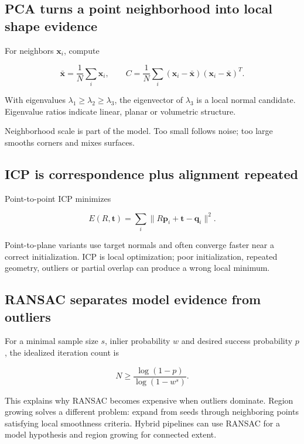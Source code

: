 \subsection{PCA turns a point neighborhood into local shape evidence}\label{04-visual-computing-ii-ch035-pca-turns-a-point-neighborhood-into-local-shape-evidence}

For neighbors \(\mathbf x_i\), compute

\[
\bar{\mathbf x}=\frac1N\sum_i\mathbf x_i,
\qquad
C=\frac1N\sum_i(\mathbf x_i-\bar{\mathbf x})(\mathbf x_i-\bar{\mathbf x})^T.
\]

With eigenvalues \(\lambda_1\ge\lambda_2\ge\lambda_3\), the eigenvector of \(\lambda_3\) is a local normal candidate. Eigenvalue ratios indicate linear, planar or volumetric structure.

Neighborhood scale is part of the model. Too small follows noise; too large smooths corners and mixes surfaces.

\subsection{ICP is correspondence plus alignment repeated}\label{04-visual-computing-ii-ch035-icp-is-correspondence-plus-alignment-repeated}

Point-to-point ICP minimizes

\[
E(R,\mathbf t)=\sum_i\|R\mathbf p_i+\mathbf t-\mathbf q_i\|^2.
\]

Point-to-plane variants use target normals and often converge faster near a correct initialization. ICP is local optimization; poor initialization, repeated geometry, outliers or partial overlap can produce a wrong local minimum.

\subsection{RANSAC separates model evidence from outliers}\label{04-visual-computing-ii-ch035-ransac-separates-model-evidence-from-outliers}

For a minimal sample size \(s\), inlier probability \(w\) and desired success probability \(p\), the idealized iteration count is

\[
N\ge \frac{\log(1-p)}{\log(1-w^s)}.
\]

This explains why RANSAC becomes expensive when outliers dominate. Region growing solves a different problem: expand from seeds through neighboring points satisfying local smoothness criteria. Hybrid pipelines can use RANSAC for a model hypothesis and region growing for connected extent.

